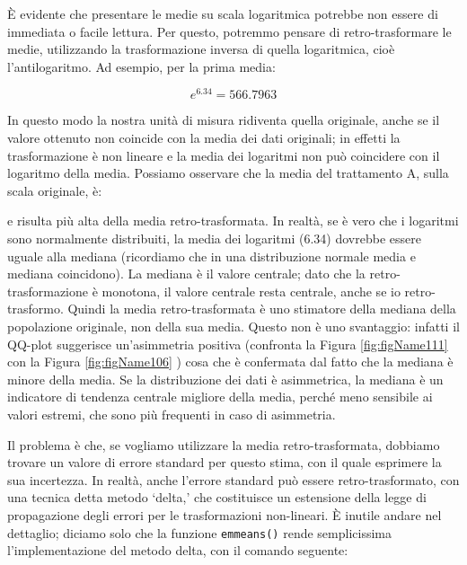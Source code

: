 \documentclass[a4paper,12pt,oneside]{book}
\newenvironment{Shaded}{\begin{snugshade}}{\end{snugshade}}
\newcommand{\SpecialCharTok}[1]{#1}
\newcommand{\StringTok}[1]{#1}
\newcommand{\DocumentationTok}[1]{#1}
\newcommand{\FunctionTok}[1]{#1}
\newcommand{\NormalTok}[1]{#1}
\begin{document}
È evidente che presentare le medie su scala logaritmica potrebbe non essere di immediata o facile lettura. Per questo, potremmo pensare di retro-trasformare le medie, utilizzando la trasformazione inversa di quella logaritmica, cioè l'antilogaritmo. Ad esempio, per la prima media:

\[e^{6.34} = 566.7963\]

In questo modo la nostra unità di misura ridiventa quella originale, anche se il valore ottenuto non coincide con la media dei dati originali; in effetti la trasformazione è non lineare e la media dei logaritmi non può coincidere con il logaritmo della media. Possiamo osservare che la media del trattamento A, sulla scala originale, è:

\begin{Shaded}
\end{Shaded}

e risulta più alta della media retro-trasformata. In realtà, se è vero che i logaritmi sono normalmente distribuiti, la media dei logaritmi (6.34) dovrebbe essere uguale alla mediana (ricordiamo che in una distribuzione normale media e mediana coincidono). La mediana è il valore centrale; dato che la retro-trasformazione è monotona, il valore centrale resta centrale, anche se io retro-trasformo. Quindi la media retro-trasformata è uno stimatore della mediana della popolazione originale, non della sua media. Questo non è uno svantaggio: infatti il QQ-plot suggerisce un'asimmetria positiva (confronta la Figura \ref{fig:figName111} con la Figura \ref{fig:figName106} ) cosa che è confermata dal fatto che la mediana è minore della media. Se la distribuzione dei dati è asimmetrica, la mediana è un indicatore di tendenza centrale migliore della media, perché meno sensibile ai valori estremi, che sono più frequenti in caso di asimmetria.

Il problema è che, se vogliamo utilizzare la media retro-trasformata, dobbiamo trovare un valore di errore standard per questo stima, con il quale esprimere la sua incertezza. In realtà, anche l'errore standard può essere retro-trasformato, con una tecnica detta metodo `delta,' che costituisce un estensione della legge di propagazione degli errori per le trasformazioni non-lineari. È inutile andare nel dettaglio; diciamo solo che la funzione \texttt{emmeans()} rende semplicissima l'implementazione del metodo delta, con il comando seguente:
\end{document}
